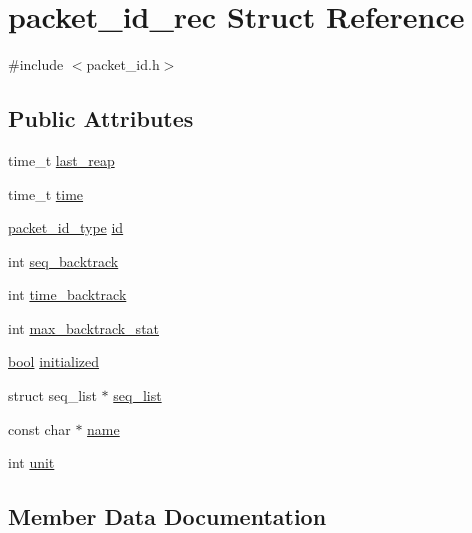 \hypertarget{structpacket__id__rec}{}\section{packet\+\_\+id\+\_\+rec Struct Reference}
\label{structpacket__id__rec}


{\ttfamily \#include $<$packet\+\_\+id.\+h$>$}

\subsection*{Public Attributes}
\begin{DoxyCompactItemize}
\item 
time\+\_\+t \hyperlink{structpacket__id__rec_ae48290bba1b5106d4f8e7ce52dba5fb3}{last\+\_\+reap}
\item 
time\+\_\+t \hyperlink{structpacket__id__rec_a2ce095b775678e4cc3d4dfb9b0d316b0}{time}
\item 
\hyperlink{packet__id_8h_a345f753b1c6ea20d24409e769aadb7e6}{packet\+\_\+id\+\_\+type} \hyperlink{structpacket__id__rec_ad3b409427fd1ab6dbc8619e321e6e86e}{id}
\item 
int \hyperlink{structpacket__id__rec_a8d2bb1d55221ff514cffbd9d9801c78f}{seq\+\_\+backtrack}
\item 
int \hyperlink{structpacket__id__rec_abc36bfa9bd524c9990ed130b843de895}{time\+\_\+backtrack}
\item 
int \hyperlink{structpacket__id__rec_ad87d6c791fd9b2a09f59a9f9f5440289}{max\+\_\+backtrack\+\_\+stat}
\item 
\hyperlink{automatic_8c_abb452686968e48b67397da5f97445f5b}{bool} \hyperlink{structpacket__id__rec_a69ead4209aacd94e671f0424f8ea1c85}{initialized}
\item 
struct seq\+\_\+list $\ast$ \hyperlink{structpacket__id__rec_aedcc1edb752ff0a34eb11fb5fadcfd9a}{seq\+\_\+list}
\item 
const char $\ast$ \hyperlink{structpacket__id__rec_a90800a60f5623bdf213f96f639989733}{name}
\item 
int \hyperlink{structpacket__id__rec_a5a7a032c5698f8052b9bae8bdf46bc0f}{unit}
\end{DoxyCompactItemize}


\subsection{Member Data Documentation}
\hypertarget{structpacket__id__rec_ad3b409427fd1ab6dbc8619e321e6e86e}{}
